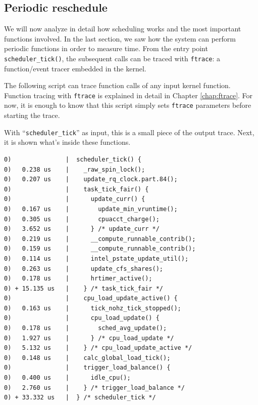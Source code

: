 \subsection{Periodic reschedule}
We will now analyze in detail how scheduling works and the most important functions involved. In the last section, we saw how the system can perform periodic functions in order to measure time. From the entry point \verb|scheduler_tick()|, the subsequent calls can be traced with \verb|ftrace|: a function/event tracer embedded in the kernel.

The following script can trace function calls of any input kernel function. Function tracing with \verb|ftrace| is explained in detail in Chapter \ref{chap:ftrace}. For now, it is enough to know that this script simply sets \verb|ftrace| parameters before starting the trace. 
With ``\verb|scheduler_tick|'' as input, this is a small piece of the output trace. Next, it is shown what's inside these functions.
\begin{Verbatim}
0)               |  scheduler_tick() {
0)   0.238 us    |    _raw_spin_lock();
0)   0.207 us    |    update_rq_clock.part.84();
0)               |    task_tick_fair() {
0)               |      update_curr() {
0)   0.167 us    |        update_min_vruntime();
0)   0.305 us    |        cpuacct_charge();
0)   3.652 us    |      } /* update_curr */
0)   0.219 us    |      __compute_runnable_contrib();
0)   0.159 us    |      __compute_runnable_contrib();
0)   0.114 us    |      intel_pstate_update_util();
0)   0.263 us    |      update_cfs_shares();
0)   0.178 us    |      hrtimer_active();
0) + 15.135 us   |    } /* task_tick_fair */
0)               |    cpu_load_update_active() {
0)   0.163 us    |      tick_nohz_tick_stopped();
0)               |      cpu_load_update() {
0)   0.178 us    |        sched_avg_update();
0)   1.927 us    |      } /* cpu_load_update */
0)   5.132 us    |    } /* cpu_load_update_active */
0)   0.148 us    |    calc_global_load_tick();
0)               |    trigger_load_balance() {
0)   0.400 us    |      idle_cpu();
0)   2.760 us    |    } /* trigger_load_balance */
0) + 33.332 us   |  } /* scheduler_tick */
\end{Verbatim}

